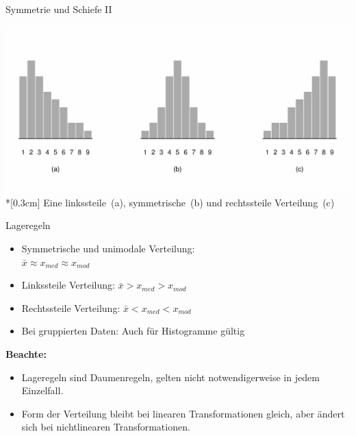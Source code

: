 \documentclass[
  10pt,
  ignorenonframetext,
]{beamer}
\providecommand{\tightlist}{%
  \setlength{\itemsep}{0pt}\setlength{\parskip}{0pt}}
\begin{document}
\begin{frame}{Symmetrie und Schiefe II}
\label{symmetrie-und-schiefe-ii}
\begin{center}
        \includegraphics[width=.8\textwidth]{pics/2-lage}\\*[0.3cm]
        {\small Eine linkssteile~(a), symmetrische~(b) und rechtssteile
Verteilung~(c)}
    \end{center}
\end{frame}

\begin{frame}{Lageregeln}
\label{lageregeln}
\begin{itemize}
\tightlist
\item
  Symmetrische und unimodale Verteilung:\\
  \(\bar{x} \approx x_{med} \approx x_{mod}\)
\item
  Linkssteile Verteilung: \(\bar{x} > x_{med} > x_{mod}\)
\item
  Rechtssteile Verteilung: \(\bar{x} < x_{med} < x_{mod}\)
\item
  Bei gruppierten Daten: Auch für Histogramme gültig
\end{itemize}

\textbf{Beachte:}

\begin{itemize}
\tightlist
\item
  Lageregeln sind Daumenregeln, gelten nicht notwendigerweise in jedem
  Einzelfall.
\item
  Form der Verteilung bleibt bei linearen Transformationen gleich, aber
  ändert sich bei nichtlinearen Transformationen.
\end{itemize}
\end{frame}
\end{document}
